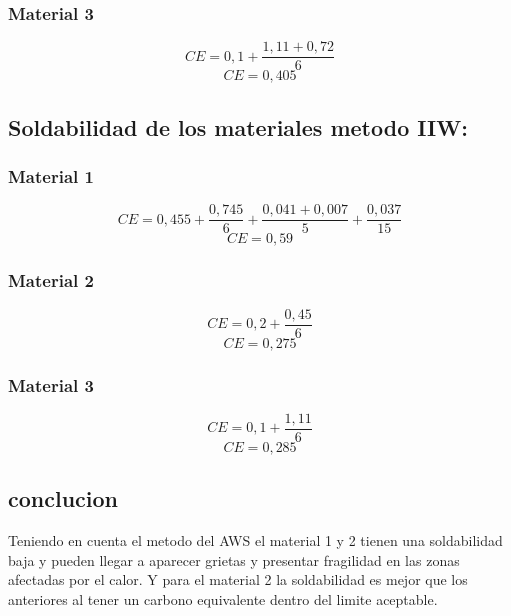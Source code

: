\documentclass[12pt,a4paper]{article}
\begin{document}
\subsubsection{Material 3}
\begin{equation*}
    CE = 0,1 + \frac{1,11 + 0,72}{6} 
\end{equation*}
\begin{equation*}
    CE = 0,405
\end{equation*}


\subsection{Soldabilidad de los materiales metodo IIW:}
\subsubsection{Material 1}
\begin{equation*}
    CE = 0,455 + \frac{0,745}{6} + \frac{0,041 + 0,007}{5} + \frac{0,037}{15}
\end{equation*}
\begin{equation*}
    CE = 0,59
\end{equation*}

\subsubsection{Material 2}
\begin{equation*}
    CE = 0,2 + \frac{0,45}{6} 
\end{equation*}
\begin{equation*}
    CE = 0,275
\end{equation*}

\subsubsection{Material 3}
\begin{equation*}
    CE = 0,1 + \frac{1,11}{6} 
\end{equation*}
\begin{equation*}
    CE = 0,285
\end{equation*}

\subsection{conclucion}
Teniendo en cuenta el metodo del AWS el material 1 y 2 tienen una soldabilidad baja y pueden llegar a aparecer grietas y presentar fragilidad en las zonas afectadas por el calor.
Y para el material 2 la soldabilidad es mejor que los anteriores al tener un carbono equivalente dentro del limite aceptable.
\end{document}
